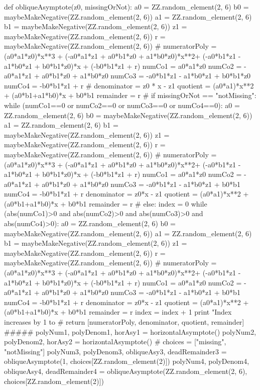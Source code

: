 \documentclass{ximera}
\begin{document}
\begin{sagesilent}
def obliqueAsymptote(z0, missingOrNot):
    a0 = ZZ.random_element(2, 6)
    b0 = maybeMakeNegative(ZZ.random_element(2, 6))
    a1 = ZZ.random_element(2, 6)
    b1 = maybeMakeNegative(ZZ.random_element(2, 6))
    z1 = maybeMakeNegative(ZZ.random_element(2, 6))
    r = maybeMakeNegative(ZZ.random_element(2, 6))
    #
    numeratorPoly = (a0*a1*z0)*x**3 + (-a0*a1*z1 + a0*b1*z0 + a1*b0*z0)*x**2+ (-a0*b1*z1 - a1*b0*z1 + b0*b1*z0)*x + (-b0*b1*z1 + r)
    numCo1 = a0*a1*z0
    numCo2 = -a0*a1*z1 + a0*b1*z0 + a1*b0*z0
    numCo3 = -a0*b1*z1 - a1*b0*z1 + b0*b1*z0
    numCo4 = -b0*b1*z1 + r
    #
    denominator = z0 * x - z1
    quotient = (a0*a1)*x**2 + (a0*b1+a1*b0)*x + b0*b1
    remainder = r
    #
    if missingOrNot == "notMissing":
        while (numCo1==0 or numCo2==0 or numCo3==0 or numCo4==0):
            a0 = ZZ.random_element(2, 6)
            b0 = maybeMakeNegative(ZZ.random_element(2, 6))
            a1 = ZZ.random_element(2, 6)
            b1 = maybeMakeNegative(ZZ.random_element(2, 6))
            z1 = maybeMakeNegative(ZZ.random_element(2, 6))
            r = maybeMakeNegative(ZZ.random_element(2, 6))
            #
            numeratorPoly = (a0*a1*z0)*x**3 + (-a0*a1*z1 + a0*b1*z0 + a1*b0*z0)*x**2+ (-a0*b1*z1 - a1*b0*z1 + b0*b1*z0)*x + (-b0*b1*z1 + r)
            numCo1 = a0*a1*z0
            numCo2 = -a0*a1*z1 + a0*b1*z0 + a1*b0*z0
            numCo3 = -a0*b1*z1 - a1*b0*z1 + b0*b1
            numCo4 = -b0*b1*z1 + r
            denominator = z0*x - z1
            quotient = (a0*a1)*x**2 + (a0*b1+a1*b0)*x + b0*b1
            remainder = r
            #
    else:
        index =  0
        while (abs(numCo1)>0 and abs(numCo2)>0 and abs(numCo3)>0 and abs(numCo4)>0):
            a0 = ZZ.random_element(2, 6)
            b0 = maybeMakeNegative(ZZ.random_element(2, 6))
            a1 = ZZ.random_element(2, 6)
            b1 = maybeMakeNegative(ZZ.random_element(2, 6))
            z1 = maybeMakeNegative(ZZ.random_element(2, 6))
            r = maybeMakeNegative(ZZ.random_element(2, 6))
            #
            numeratorPoly = (a0*a1*z0)*x**3 + (-a0*a1*z1 + a0*b1*z0 + a1*b0*z0)*x**2+ (-a0*b1*z1 - a1*b0*z1 + b0*b1*z0)*x + (-b0*b1*z1 + r)
            numCo1 = a0*a1*z0
            numCo2 = -a0*a1*z1 + a0*b1*z0 + a1*b0*z0
            numCo3 = -a0*b1*z1 - a1*b0*z1 + b0*b1
            numCo4 = -b0*b1*z1 + r
            denominator = z0*x - z1
            quotient = (a0*a1)*x**2 + (a0*b1+a1*b0)*x + b0*b1
            remainder = r
            index =  index + 1
            print "Index increases by 1 to %
            #
    return [numeratorPoly, denominator, quotient, remainder]
#####
polyNum1, polyDenom1, horAsy1 = horizontalAsymptote()
polyNum2, polyDenom2, horAsy2 = horizontalAsymptote()
#
choices = ["missing", "notMissing"]
polyNum3, polyDenom3, obliqueAsy3, deadRemainder3 = obliqueAsymptote(1, choices[ZZ.random_element(2)])
polyNum4, polyDenom4, obliqueAsy4, deadRemainder4 = obliqueAsymptote(ZZ.random_element(2, 6), choices[ZZ.random_element(2)])
\end{sagesilent}
 
\end{document}
